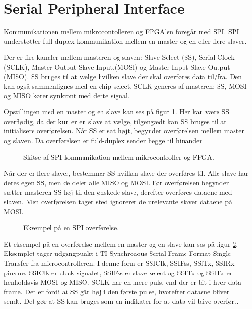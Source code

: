 \section{Serial Peripheral Interface}
\label{app:spi}
Kommunikationen mellem mikrocontolleren og FPGA’en foregår med SPI. 
SPI understøtter full-duplex kommunikation mellem en master og en eller flere slaver.

Der er fire kanaler mellem masteren og slaven: Slave Select (SS), Serial Clock (SCLK), Master Output Slave Input.(MOSI) og Master Input Slave Output (MISO). SS bruges til at vælge hvilken slave der skal overføres data til/fra. Den kan også sammenlignes med en chip select. SCLK generes af masteren; SS, MOSI og MISO kører synkront med dette signal.

Opstillingen med en master og en slave kan ses på figur \ref{fig:SPImasterslave}. 
Her kan være SS overflødig, da der kun er en slave at vælge, tilgengædt kan SS bruges til at initialisere overførelsen. 
Når SS er sat højt, begynder overførelsen mellem master og slaven. Da overførelsen er fuld-duplex sender begge til hinanden 
\begin{figure}[!th]
\centering
\begin{tikzpicture}[scale=0.7]

\end{tikzpicture}
\caption[SPI protokol]{Skitse af SPI-kommunikation mellem mikrocontroller og FPGA.}
\label{fig:SPImasterslave}
\end{figure}

Når der er flere slaver, bestemmer SS hvilken slave der overføres til.
Alle slave har deres egen SS, men de deler alle MISO og MOSI. 
Før overførelsen begynder sætter masteren SS høj til den ønskede slave,
derefter overføres dataene med slaven.
Men overførelsen tager sted ignorerer de urelevante slaver dataene på MOSI.  



\begin{figure}[!th]
\centering
\begin{tikzpicture}[scale=0.8]

\end{tikzpicture}
\caption[SPI overførelse]{Eksempel på en SPI overførelse.}
\label{fig:SPIfigur}
\end{figure}

Et eksempel på en overførelse mellem en master og en slave kan ses på figur \ref{fig:SPIfigur}. 
Eksemplet tager udgangpunkt i TI Synchronous Serial Frame Format Single Transfer \cite[s. 476]{lm3s6965} fra microcontrolleren.
I denne form er SSIClk, SSIFss, SSITx, SSIRx pins'ne. SSIClk er clock signalet, SSIFss er slave select og SSITx og SSITx er henholdsvis MOSI og MISO.
SCLK har en mere puls, end der er bit i hver data-frame. Det er fordi at SS går høj i den første pulse, hvorefter dataene bliver sendt. 
Det gør at SS kan bruges som en indikater for at data vil blive overført.
   


